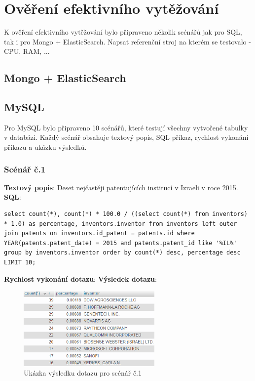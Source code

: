 \lstset{style=sqlstyle}

\chapter{Ověření efektivního vytěžování}
K ověření efektivního vytěžování bylo připraveno několik scénářů jak pro SQL, tak i pro Mongo + ElasticSearch.\newline
Napsat referenční stroj na kterém se testovalo - CPU, RAM, ...
\section{Mongo + ElasticSearch}
\section{MySQL}
Pro MySQL bylo připraveno 10 scénářů, které testují všechny vytvořené tabulky v databázi. Každý scénář obsahuje textový popis, SQL příkaz, rychlost vykonání příkazu a ukázku výsledků.

\subsection{Scénář č.1}
\textbf{Textový popis}: Deset nejčastěji patentujících institucí v Izraeli v roce 2015.
\newline
\textbf{SQL}: 
\begin{lstlisting}[label = {lst:elements_a}]
select count(*), count(*) * 100.0 / ((select count(*) from inventors) * 1.0) as percentage, inventors.inventor from inventors left outer join patents on inventors.id_patent = patents.id where YEAR(patents.patent_date) = 2015 and patents.patent_id like '%IL%' group by inventors.inventor order by count(*) desc, percentage desc LIMIT 10;
\end{lstlisting}
\textbf{Rychlost vykonání dotazu}: 
\newline
\textbf{Výsledek dotazu}:
\begin{figure}[H]
\centering
\includegraphics[width=7cm]{img/scenare/scenar_1}
\caption{Ukázka výsledku dotazu pro scénář č.1}
\label{fig:scenar1}
\end{figure}



